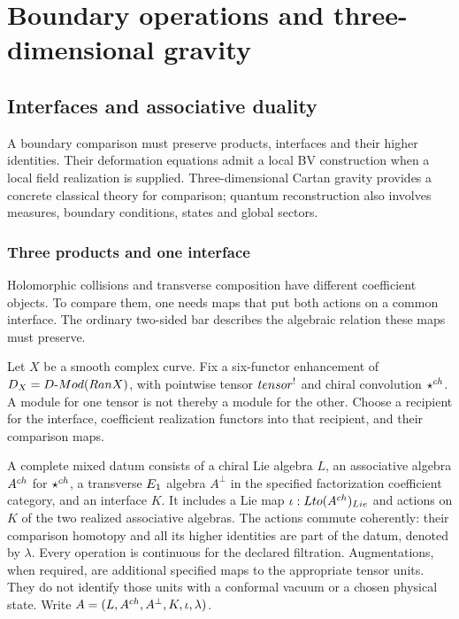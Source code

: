 \part{Boundary operations and three-dimensional gravity}


\chapter{Interfaces and associative duality}
\begin{summarybox}
A boundary comparison must preserve products, interfaces and their higher
identities. Their deformation equations admit a local BV construction when
a local field realization is supplied. Three-dimensional Cartan gravity
provides a concrete classical theory for comparison; quantum reconstruction
also involves measures, boundary conditions, states and global sectors.
\end{summarybox}

\section{Three products and one interface}
Holomorphic collisions and transverse composition have different coefficient
objects. To compare them, one needs maps that put both actions on a common
interface. The ordinary two-sided bar describes the algebraic relation these
maps must preserve.

Let $X$ be a smooth complex curve. Fix a six-functor enhancement of
$D_X=D\text{-}Mod(Ran X)$, with pointwise tensor $tensor^!$
and chiral convolution $\mathbin{\star^{ch}}$. A module for one tensor is not thereby
a module for the other. Choose a recipient for the interface, coefficient
realization functors into that recipient, and their comparison maps.

\begin{definition}
A complete mixed datum consists of a chiral Lie algebra $L$, an associative
algebra $A^{ch}$ for $\mathbin{\star^{ch}}$, a transverse $E_1$ algebra $A^\perp$
in the specified factorization coefficient category, and an interface $K$.
It includes a Lie map $\iota:Lto(A^{ch})_{Lie}$ and actions on $K$
of the two realized associative algebras. The actions commute coherently:
their comparison homotopy and all its higher identities are part of the datum,
denoted by $\lambda$. Every operation is continuous for the declared filtration.
Augmentations, when required, are additional specified maps to the appropriate
tensor units. They do not identify those units with a conformal vacuum or a
chosen physical state. Write $A=(L,A^{ch},A^\perp,K,\iota,\lambda)$.
\end{definition}

